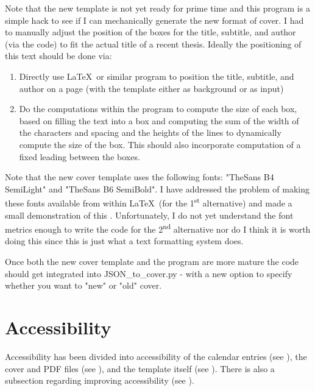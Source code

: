 Note that the new template is not yet ready for prime time and this program is a simple hack to see if I can mechanically generate the new format of cover. I had to manually adjust the position of the boxes for the title, subtitle, and author (via the code) to fit the actual title of a recent thesis. Ideally the positioning of this text should be done via:
\begin{enumerate}
\item Directly use \LaTeX~or similar program to position the title, subtitle, and author on a page (with the template either as background or as input)

\item Do the computations within the program to compute the size of each box, based on filling the text into a box and computing the sum of the width of the characters and spacing and the heights of the lines to dynamically compute the size of the box. This should also incorporate computation of a fixed leading between the boxes.
\end{enumerate}

Note that the new cover template uses the following fonts: "TheSans B4 SemiLight" and "TheSans B6 SemiBold". I have addressed the problem of making these fonts available from within \LaTeX~(for the 1\textsuperscript{st} alternative) and made a small demonstration of this . Unfortunately, I do not yet understand the font metrics enough to write the code for the 2\textsuperscript{nd} alternative nor do I think it is worth doing this since this is just what a text formatting system does.

Once both the new cover template and the program are more mature the code should get integrated into JSON\_to\_cover.py - with a new option to specify whether you want to "new" or "old" cover.

\section{Accessibility}
\label{sec:accessibility}
Accessibility has been divided into accessibility of the calendar entries (see ), the cover and PDF files (see ), and the template itself (see ). There is also a subsection regarding improving accessibility (see ).

